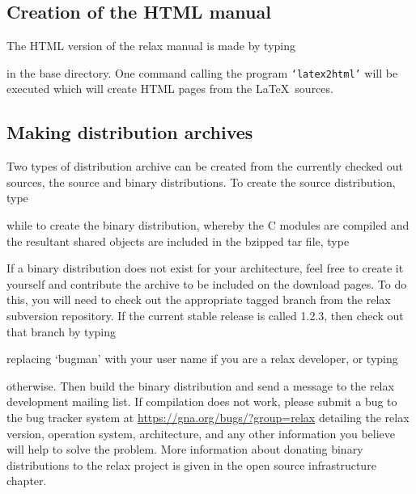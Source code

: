 \subsection{Creation of the HTML manual}

The HTML version of the relax manual is made by typing


in the base directory.  One command calling the program \texttt{`latex2html'} will be executed which will create HTML pages from the \LaTeX\ sources.


\subsection{Making distribution archives}

Two types of distribution archive can be created from the currently checked out sources, the source and binary distributions.  To create the source distribution, type 


while to create the binary distribution, whereby the C modules are compiled and the resultant shared objects are included in the bzipped tar file, type


If a binary distribution does not exist for your architecture, feel free to create it yourself and contribute the archive to be included on the download pages.  To do this, you will need to check out the appropriate tagged branch from the relax subversion repository.  If the current stable release is called 1.2.3, then check out that branch by typing


replacing `bugman' with your user name if you are a relax developer, or typing


otherwise.  Then build the binary distribution and send a message to the relax development mailing list.  If compilation does not work, please submit a bug to the bug tracker system at \href{https://gna.org/bugs/?group=relax}{https://gna.org/bugs/?group=relax} detailing the relax version, operation system, architecture, and any other information you believe will help to solve the problem.  More information about donating binary distributions to the relax project is given in the open source infrastructure chapter.


